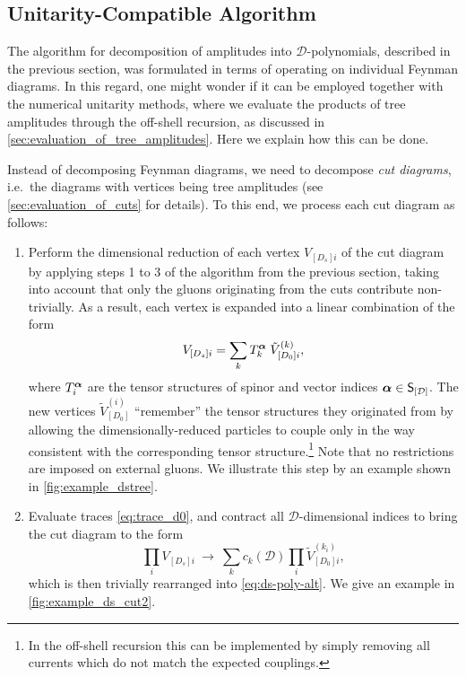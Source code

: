 \subsection{Unitarity-Compatible Algorithm}
\label{dshel:sec:unitarity-compatible}

The algorithm for decomposition of amplitudes into $\mathcal{D}$-polynomials, 
described in the previous section, was formulated 
in terms of operating on individual Feynman diagrams.
In this regard, one might wonder if it can be employed together with
the numerical unitarity methods, where we evaluate
the products of tree amplitudes through the off-shell recursion, 
as discussed in \cref{sec:evaluation_of_tree_amplitudes}.
Here we explain how this can be done.

Instead of decomposing Feynman diagrams, 
we need to decompose \emph{cut diagrams}, 
i.e.\ the diagrams with vertices being tree amplitudes 
(see \cref{sec:evaluation_of_cuts} for details).
To this end, we process each cut diagram as follows:
\begin{enumerate}
  \item Perform the dimensional reduction of each vertex $V_{[D_s]i}$ of the cut diagram by applying steps 1 to 3 of the algorithm from the previous section,
    taking into account that only the gluons originating from the cuts contribute non-trivially.
    As a result, each vertex is expanded into a linear combination of the form
    \begin{equation}
      V_{[D_s]i} = \sum_k T_k^{\vb*{\alpha}} \; \tilde{V}_{[D_0]i}^{(k)},
    \end{equation}
    where $T_i^{\vb*{\alpha}}$ are the tensor structures of spinor and vector indices $\vb*{\alpha} \in \mathsf{S}_{[\mathcal{D}]}$.
    The new vertices $\tilde{V}_{[D_0]}^{(i)}$ ``remember'' 
    the tensor structures they originated from by allowing the dimensionally-reduced particles 
    to couple only in the way consistent with the corresponding tensor structure.\footnote{
      In the off-shell recursion this can be implemented by simply removing all currents which do not match the expected couplings.
    }
    Note that no restrictions are imposed on external gluons.
    We illustrate this step by an example shown in \cref{fig:example_dstree}.

  \item Evaluate traces \eqref{eq:trace_d0}, and contract all $\mathcal{D}$-dimensional indices
    to bring the cut diagram to the form
    \begin{equation}
      \prod_i V_{[D_s]i} ~\to~  \sum_k c_k(\mathcal{D}) \prod_i \tilde{V}_{[D_0]i}^{(k_i)},
    \end{equation}
    which is then trivially rearranged into \cref{eq:ds-poly-alt}.  We give an example in \cref{fig:example_ds_cut2}.
\end{enumerate}

